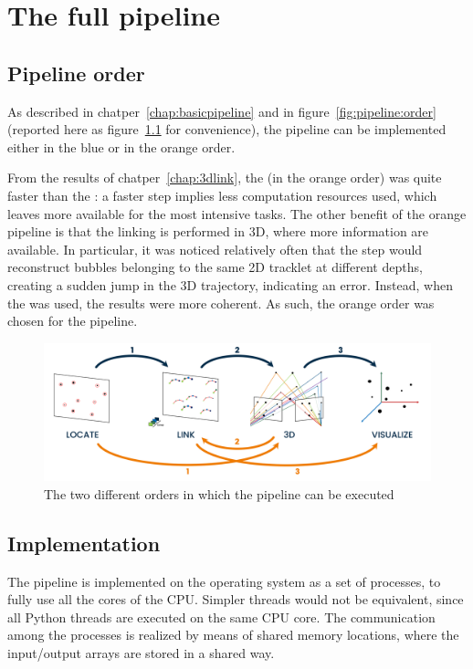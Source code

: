 \chapter{The full pipeline}
\label{chap:pipeline}

\section{Pipeline order}

As described in chatper~\ref{chap:basicpipeline} and in figure~\ref{fig:pipeline:order} (reported here as figure~\ref{fig:pipeline:order-again} for convenience), the pipeline can be implemented either in the blue or in the orange order.

From the results of chatper~\ref{chap:3dlink}, the \linkDDD* (in the orange order) was quite faster than the \linkDD*: a faster step implies less computation resources used, which leaves more available for the most intensive tasks.
The other benefit of the orange pipeline is that the linking is performed in 3D, where more information are available.
In particular, it was noticed relatively often that the \match* step would reconstruct bubbles belonging to the same 2D tracklet at different depths, creating a sudden jump in the 3D trajectory, indicating an error.
Instead, when the \linkDDD* was used, the results were more coherent.
As such, the orange order was chosen for the pipeline.

\begin{figure}
	\centerline{\includegraphics[width=\textwidth]{images/pipeline-orders.png}}
	\caption{\centering The two different orders in which the pipeline can be executed}
	\label{fig:pipeline:order-again}
\end{figure}

\section{Implementation}

The pipeline is implemented on the operating system as a set of processes, to fully use all the cores of the CPU.
Simpler threads would not be equivalent, since all Python threads are executed on the same CPU core.
The communication among the processes is realized by means of shared memory locations, where the input/output arrays are stored in a shared way.

